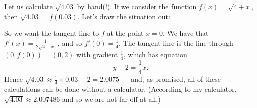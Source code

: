 \begin{ex}
  Let us calculate $ \sqrt{4.03} $ by hand(!). If we consider the function $ f(x) = \sqrt{4 + x} $,
  then $ \sqrt{4.03} = f(0.03) $. Let's draw the situation out:
  \begin{center}
  \end{center}
  So we want the tangent line to $ f $ at the point $ x = 0 $. We have that $ f'(x) = \frac{1}{2\sqrt{4 + x}} $ ,
  and so $ f'(0) = \frac{1}{4} $. The tangent line is the line through $ (0, f(0)) = (0, 2) $ with gradient $ \frac{1}{4} $,
  which has equation
  \begin{displaymath}
    y - 2 = \frac{1}{4}x.
  \end{displaymath}
  Hence $ \sqrt{4.03} \approx \frac{1}{4} \times 0.03 + 2 = 2.0075 $ --- and, as promised, all of these calculations
  can be done without a calculator. (According to my calculator, $ \sqrt{4.03} \approx 2.007486 $ and so we are not far
  off at all.)

\end{ex}

